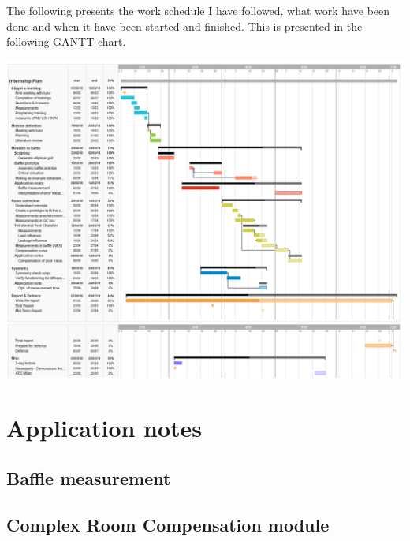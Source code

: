 \documentclass{report}
\begin{document}
\begin{appendices}
The following presents the work schedule I have followed, what work have been done and when it have been started and finished. This is presented in the following GANTT chart.

\begin{center}
	\includegraphics[width=\textwidth]{Appendix/Plan1} 
\end{center}


\chapter{Application notes}

\section{Baffle measurement}
\label{chap:AN_Baffle}


\section{Complex Room Compensation module}
\label{chap:AN_CRC}


\end{appendices}
\end{document}
